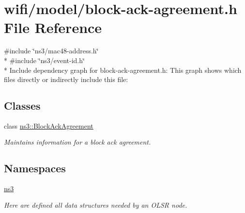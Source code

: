 \hypertarget{block-ack-agreement_8h}{}\section{wifi/model/block-\/ack-\/agreement.h File Reference}
\label{block-ack-agreement_8h}
{\ttfamily \#include \char`\"{}ns3/mac48-\/address.\+h\char`\"{}}\\*
{\ttfamily \#include \char`\"{}ns3/event-\/id.\+h\char`\"{}}\\*
Include dependency graph for block-\/ack-\/agreement.h\+:
This graph shows which files directly or indirectly include this file\+:
\subsection*{Classes}
\begin{DoxyCompactItemize}
\item 
class \hyperlink{classns3_1_1BlockAckAgreement}{ns3\+::\+Block\+Ack\+Agreement}
\begin{DoxyCompactList}\small\item\em Maintains information for a block ack agreement. \end{DoxyCompactList}\end{DoxyCompactItemize}
\subsection*{Namespaces}
\begin{DoxyCompactItemize}
\item 
 \hyperlink{namespacens3}{ns3}
\begin{DoxyCompactList}\small\item\em Here are defined all data structures needed by an O\+L\+SR node. \end{DoxyCompactList}\end{DoxyCompactItemize}
